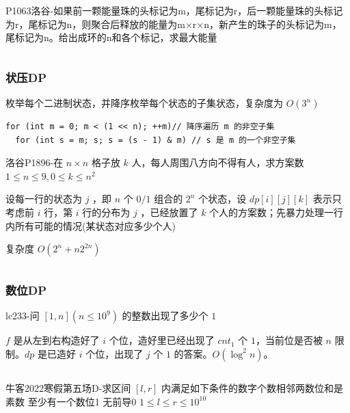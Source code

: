 \documentclass[twocolumn,10pt]{ctexart}
\newcommand{\cds}[1]{\ding{\numexpr191+#1\relax}}
\begin{document}
\inputminted{cpp}{code/p1880_dp_on_interval.cpp}

\begin{notebox}
P1063洛谷-如果前一颗能量珠的头标记为m，尾标记为r，后一颗能量珠的头标记为r，尾标记为n，则聚合后释放的能量为m×r×n，新产生的珠子的头标记为m，尾标记为n。给出成环的n和各个标记，求最大能量
\end{notebox}

\inputminted{cpp}{code/p1063_dp_on_interval.cpp}

\subsubsection{状压DP}

枚举每个二进制状态，并降序枚举每个状态的子集状态，复杂度为 $O(3^n)$

\begin{verbatim}
for (int m = 0; m < (1 << n); ++m)// 降序遍历 m 的非空子集
  for (int s = m; s; s = (s - 1) & m) // s 是 m 的一个非空子集
\end{verbatim}

\begin{notebox}
洛谷P1896-在 $n\times n$ 格子放 $k$ 人，每人周围八方向不得有人，求方案数 $1\le n\le9,0\le k\le n^2$
\end{notebox}

设每一行的状态为 $j$ ，即 $n$ 个 $0/1$ 组合的 $2^n$ 个状态，设 $dp[i][j][k]$ 表示只考虑前 $i$ 行，第 $i$ 行的分布为 $j$ ，已经放置了 $k$ 个人的方案数；先暴力处理一行内所有可能的情况(某状态对应多少个人)

复杂度 $O(2^n+n2^{2n})$

\inputminted{cpp}{code/p1896_dp_on_state.cpp}

\subsubsection{数位DP}

\begin{notebox}
lc233-问 $[1,n](n\le 10^9)$ 的整数出现了多少个 $1$
\end{notebox}

$f$ 是从左到右构造好了 $i$ 个位，造好里已经出现了 $cnt_1$ 个 $1$，当前位是否被 $n$ 限制。$dp$ 是已造好 $i$ 个位，出现了 $j$ 个 $1$ 的答案。$O(\log^2n)$。

\inputminted{cpp}{code/ext_054.cpp}

\begin{notebox}
牛客2022寒假第五场D-求区间 $[l,r]$ 内满足如下条件的数字个数\cds{1}相邻两数位和是素数 \cds{2}至少有一个数位1 \cds{3}无前导0 $1\le l\le r\le10^{10}$
\end{notebox}
\end{document}
